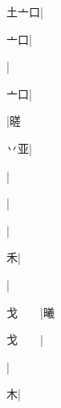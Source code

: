 \begin{multicols}{2}
{{\cjk{}土亠口}|{}\par
{\cjk{}{\cnsym{}　}亠口}|{}\par
{\cjk{}{\cnsym{}　}{\cnsym{}　}{\cnsym{}　}}|{}\par
{\cjk{}{\cnsym{}　}亠口}|{}\par
{\cjk{}{\cnsym{}　}{\cnsym{}　}{\cnsym{}　}}|{\cjk{}暛}\par
{\cjk{}{\cnsym{}　}丷亚}|{}\par
{\cjk{}{\cnsym{}　}{\cnsym{}　}{\cnsym{}　}}|{}\par
{\cjk{}{\cnsym{}　}{\cnsym{}　}{\cnsym{}　}}|{}\par
{\cjk{}{\cnsym{}　}{\cnsym{}　}{\cnsym{}　}}|{}\par
{\cjk{}{\cnsym{}　}{\cnsym{}　}禾}|{}\par
{\cjk{}{\cnsym{}　}{\cnsym{}　}{\cnsym{}　}}|{}\par
{\cjk{}戈{\cnsym{}　}{\cnsym{}　}}|{\cjk{}曦}\par
{\cjk{}戈{\cnsym{}　}{\cnsym{}　}}|{}\par
{\cjk{}{\cnsym{}　}{\cnsym{}　}{\cnsym{}　}}|{}\par
{\cjk{}{\cnsym{}　}{\cnsym{}　}木}|{}\par
}
\end{multicols}
